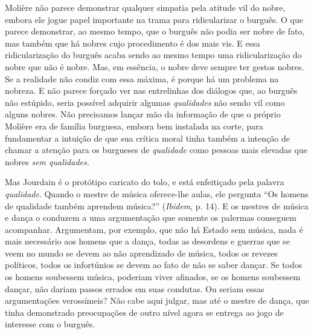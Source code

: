 Molière não parece demonstrar qualquer simpatia pela atitude vil do
nobre, embora ele jogue papel importante na trama para ridicularizar o
burguês. O que parece demonstrar, ao mesmo tempo, que o burguês não
podia ser nobre de fato, mas também que há nobres cujo procedimento é
dos mais vis. E essa ridicularização do burguês acaba sendo ao mesmo
tempo uma ridicularização do nobre que não é nobre. Mas, em essência, o
nobre deve sempre ter gestos nobres. Se a realidade não condiz com essa
máxima, é porque há um problema na nobreza. E não parece forçado ver nas
entrelinhas dos diálogos que, ao burguês não estúpido, seria possível
adquirir algumas \emph{qualidades} não sendo vil como alguns nobres. Não
precisamos lançar mão da informação de que o próprio Molière era de
família burguesa, embora bem instalada na corte, para fundamentar a
intuição de que sua crítica moral tinha também a intenção de chamar a
atenção para os burgueses de \emph{qualidade} como pessoas mais elevadas
que nobres \emph{sem qualidades.}

Mas Jourdain é o protótipo caricato do tolo, e está enfeitiçado pela
palavra \emph{qualidade}. Quando o mestre de música oferece-lhe aulas,
ele pergunta ``Os homens de qualidade também aprendem música?''
(\emph{Ibidem}, p. 14). E os mestres de música e dança o conduzem a uma
argumentação que somente os palermas conseguem acompanhar. Argumentam,
por exemplo, que não há Estado sem música, nada é mais necessário aos
homens que a dança, todas as desordens e guerras que se veem no mundo se
devem ao não aprendizado de música, todos os revezes políticos, todos os
infortúnios se devem ao fato de não se saber dançar. Se todos os homens
soubessem música, poderiam viver afinados, se os homens soubessem
dançar, não dariam passos errados em suas condutas. Ou seriam essas
argumentações verossímeis? Não cabe aqui julgar, mas até o mestre de
dança, que tinha demonstrado preocupações de outro nível agora se
entrega ao jogo de interesse com o burguês.

